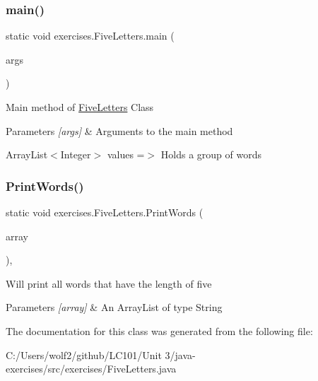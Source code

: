 \subsubsection{\texorpdfstring{main()}{main()}}
{\footnotesize\ttfamily static void exercises.\+Five\+Letters.\+main (\begin{DoxyParamCaption}\item[{String \mbox{[}$\,$\mbox{]}}]{args }\end{DoxyParamCaption})\hspace{0.3cm}{\ttfamily [static]}}

Main method of \mbox{\hyperlink{classexercises_1_1_five_letters}{Five\+Letters}} Class 
\begin{DoxyParams}{Parameters}
{\em \mbox{[}args\mbox{]}} & Arguments to the main method \\
\hline
\end{DoxyParams}
Array\+List$<$\+Integer$>$ values =$>$ Holds a group of words \mbox{\label{classexercises_1_1_five_letters_a348b407c7defcb69c0d97d0e2467ca4d}} 
\subsubsection{\texorpdfstring{PrintWords()}{PrintWords()}}
{\footnotesize\ttfamily static void exercises.\+Five\+Letters.\+Print\+Words (\begin{DoxyParamCaption}\item[{Array\+List$<$ String $>$}]{array }\end{DoxyParamCaption})\hspace{0.3cm}{\ttfamily [static]}, {\ttfamily [private]}}

Will print all words that have the length of five 
\begin{DoxyParams}{Parameters}
{\em \mbox{[}array\mbox{]}} & An Array\+List of type String \\
\hline
\end{DoxyParams}


The documentation for this class was generated from the following file\+:\begin{DoxyCompactItemize}
\item 
C\+:/\+Users/wolf2/github/\+L\+C101/\+Unit 3/java-\/exercises/src/exercises/Five\+Letters.\+java\end{DoxyCompactItemize}
